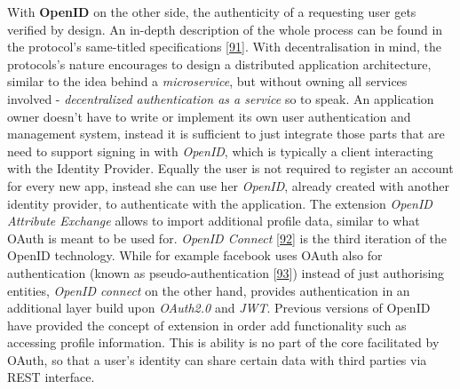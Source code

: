 \documentclass[12pt,english,a4paper,titlepage,cleardoublepage=empty,dottedtoc]{report}
\begin{document}
With \textbf{OpenID} on the other side, the authenticity of a requesting
user gets verified by design. An in-depth description of the whole
process can be found in the protocol's same-titled specifications
{[}\protect\hyperlink{ref-web_spec_openid-spec-index}{91}{]}. With
decentralisation in mind, the protocols's nature encourages to design a
distributed application architecture, similar to the idea behind a
\emph{microservice}, but without owning all services involved -
\emph{decentralized authentication as a service} so to speak. An
application owner doesn't have to write or implement its own user
authentication and management system, instead it is sufficient to just
integrate those parts that are need to support signing in with
\emph{OpenID}, which is typically a client interacting with the Identity
Provider. Equally the user is not required to register an account for
every new app, instead she can use her \emph{OpenID}, already created
with another identity provider, to authenticate with the application.
The extension \emph{OpenID Attribute Exchange} allows to import
additional profile data, similar to what OAuth is meant to be used for.
\emph{OpenID Connect}
{[}\protect\hyperlink{ref-web_spec_openid-connect-1}{92}{]} is the third
iteration of the OpenID technology. While for example facebook uses
OAuth also for authentication (known as pseudo-authentication
{[}\protect\hyperlink{ref-web_2017_wikipedia_openid-vs-pseudo-oauth}{93}{]})
instead of just authorising entities, \emph{OpenID connect} on the other
hand, provides authentication in an additional layer build upon
\emph{OAuth2.0} and \emph{JWT}. Previous versions of OpenID have
provided the concept of extension in order add functionality such as
accessing profile information. This is ability is no part of the core
facilitated by OAuth, so that a user's identity can share certain data
with third parties via REST interface.
\end{document}
